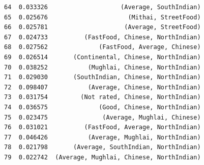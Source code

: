 \documentclass[11pt]{article} %
\begin{document}
\begin{lstlisting}
64  0.033326                    (Average, SouthIndian)
65  0.025676                      (Mithai, StreetFood)
66  0.025781                     (Average, StreetFood)
67  0.024733          (FastFood, Chinese, NorthIndian)
68  0.027562              (FastFood, Average, Chinese)
69  0.026514       (Continental, Chinese, NorthIndian)
70  0.038252           (Mughlai, Chinese, NorthIndian)
71  0.029030       (SouthIndian, Chinese, NorthIndian)
72  0.098407           (Average, Chinese, NorthIndian)
73  0.031754         (Not rated, Chinese, NorthIndian)
74  0.036575              (Good, Chinese, NorthIndian)
75  0.023475               (Average, Mughlai, Chinese)
76  0.031021          (FastFood, Average, NorthIndian)
77  0.046426           (Average, Mughlai, NorthIndian)
78  0.021798       (Average, SouthIndian, NorthIndian)
79  0.022742  (Average, Mughlai, Chinese, NorthIndian)


\end{lstlisting}
\end{document}
